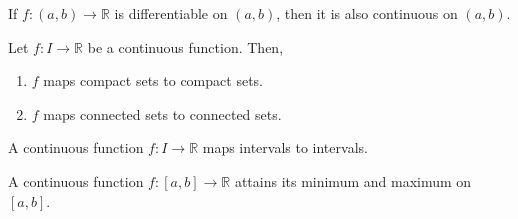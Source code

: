 \documentclass[11pt]{article}
\def\R{\mathbb{R}}
\theoremstyle{definition}
\theoremstyle{remark}
\numberwithin{equation}{module}
\begin{document}
    \begin{theorem}
        If $f\colon (a, b) \to \R$ is differentiable on $(a, b)$, then it is also
        continuous on $(a, b)$.
    \end{theorem}
    
    \begin{theorem}
        Let $f\colon I\to \R$ be a continuous function. Then, \begin{enumerate}
            \item $f$ maps compact sets to compact sets.
            \item $f$ maps connected sets to connected sets.
        \end{enumerate}
    \end{theorem}
    \begin{corollary}
        A continuous function $f\colon I \to \R$ maps intervals to intervals.
    \end{corollary}
    \begin{corollary}
        A continuous function $f\colon [a, b] \to \R$ attains its minimum and
        maximum on $[a, b]$.
    \end{corollary}
\end{document}
